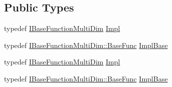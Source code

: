 \subsection*{Public Types}
\begin{DoxyCompactItemize}
\item 
typedef \mbox{\hyperlink{classROOT_1_1Math_1_1IBaseFunctionMultiDim}{I\+Base\+Function\+Multi\+Dim}} \mbox{\hyperlink{classROOT_1_1Math_1_1Functor_aef374d72e63fb0fea13a8cc3d4f2091b}{Impl}}
\item 
typedef \mbox{\hyperlink{classROOT_1_1Math_1_1IBaseFunctionMultiDim_a44c87c3e8c23d140cc3bf067d6480070}{I\+Base\+Function\+Multi\+Dim\+::\+Base\+Func}} \mbox{\hyperlink{classROOT_1_1Math_1_1Functor_acc5dacb213f26296122e95138f5153b3}{Impl\+Base}}
\item 
typedef \mbox{\hyperlink{classROOT_1_1Math_1_1IBaseFunctionMultiDim}{I\+Base\+Function\+Multi\+Dim}} \mbox{\hyperlink{classROOT_1_1Math_1_1Functor_aef374d72e63fb0fea13a8cc3d4f2091b}{Impl}}
\item 
typedef \mbox{\hyperlink{classROOT_1_1Math_1_1IBaseFunctionMultiDim_a44c87c3e8c23d140cc3bf067d6480070}{I\+Base\+Function\+Multi\+Dim\+::\+Base\+Func}} \mbox{\hyperlink{classROOT_1_1Math_1_1Functor_acc5dacb213f26296122e95138f5153b3}{Impl\+Base}}
\end{DoxyCompactItemize}
